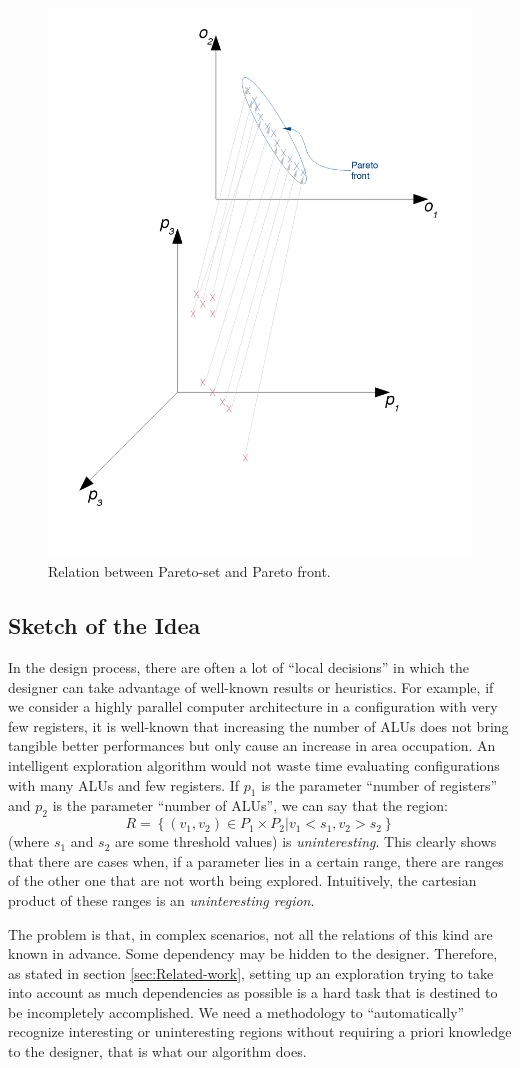 \begin{figure}[t]
\label{fig:psos}
\center
\includegraphics[width=0.5\columnwidth]{img/Pareto_set_and_front}
\caption{Relation between Pareto-set and Pareto front.}
\end{figure}

\subsection{Sketch of the Idea}

In the design process, there are often a lot of ``local decisions'' in
which the designer can take advantage of well-known results or
heuristics. For example, if we consider a highly parallel
computer architecture in a configuration with very few registers, it is
well-known that increasing the number of ALUs does not bring tangible
better performances but only cause an increase in area occupation. An
intelligent exploration algorithm would not waste time evaluating
configurations with many ALUs and few registers. If $p_{1}$ is the
parameter ``number of registers'' and $p_{2}$ is the parameter
``number of ALUs'', we can say that the region:
\[
R=\left\{ \left.\left(v_{1},v_{2}\right)\in P_{1}\times P_{2}\right|v_{1}<s_{1},v_{2}>s_{2}\right\} 
\]
 (where $s_{1}$ and $s_{2}$ are some threshold values) is \emph{uninteresting}. This clearly shows that there are cases when, if a parameter lies in
a certain range, there are ranges of the other one that are not worth being explored. Intuitively, the cartesian product of these ranges is an \emph{uninteresting region}.

The problem is that, in complex scenarios, not all the relations of this
kind are known in advance. Some dependency may be hidden
to the designer.
Therefore, as stated in section \ref{sec:Related-work},
setting up an exploration trying to take into account as much dependencies
as possible is a hard task that is destined to be incompletely
accomplished. We need a methodology to ``automatically'' recognize
interesting or uninteresting regions without requiring a priori knowledge
to the designer, that is what our algorithm does.

